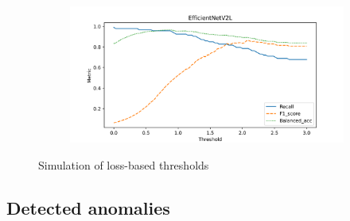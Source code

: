 \begin{figure}[!ht]
\begin{subfigure}{0.48\textwidth}
    \end{subfigure}
    \begin{subfigure}{0.48\textwidth}
        \centering
        \includegraphics[width=\textwidth]{./results/comparison/EfficientNetV2L_threshold.png}
    \end{subfigure}
    \caption{Simulation of loss-based thresholds}
    \label{fig:threshold_simulation}
\end{figure}

\subsection{Detected anomalies}